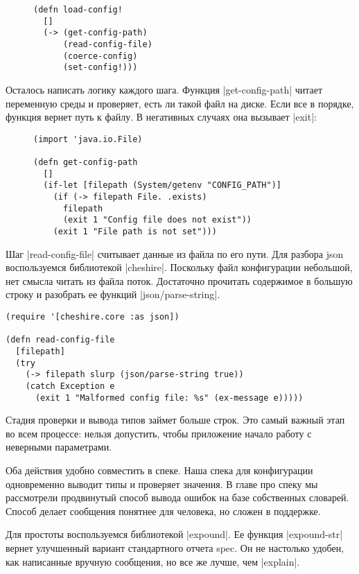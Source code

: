 \begin{figure}[!ht]
\begin{verbatim}
(defn load-config!
  []
  (-> (get-config-path)
      (read-config-file)
      (coerce-config)
      (set-config!)))
\end{verbatim}
\end{figure}

Осталось написать логику каждого шага. Функция \spverb|get-config-path| читает
переменную среды и проверяет, есть ли такой файл на диске. Если все в порядке,
функция вернет путь к файлу. В негативных случаях она вызывает \spverb|exit|:

\begin{figure}[!ht]
\begin{verbatim}
(import 'java.io.File)

(defn get-config-path
  []
  (if-let [filepath (System/getenv "CONFIG_PATH")]
    (if (-> filepath File. .exists)
      filepath
      (exit 1 "Config file does not exist"))
    (exit 1 "File path is not set")))
\end{verbatim}
\end{figure}

Шаг \spverb|read-config-file| считывает данные из файла по его пути. Для разбора json
воспользуемся библиотекой \spverb|cheshire|. Поскольку файл конфигурации небольшой, нет
смысла читать из файла поток. Достаточно прочитать содержимое в большую строку и
разобрать ее функций \spverb|json/parse-string|.

\begin{verbatim}
(require '[cheshire.core :as json])

(defn read-config-file
  [filepath]
  (try
    (-> filepath slurp (json/parse-string true))
    (catch Exception e
      (exit 1 "Malformed config file: %s" (ex-message e)))))
\end{verbatim}

Стадия проверки и вывода типов займет больше строк. Это самый важный этап во
всем процессе: нельзя допустить, чтобы приложение начало работу с неверными
параметрами.

Оба действия удобно совместить в спеке. Наша спека для конфигурации одновременно
выводит типы и проверяет значения. В главе про спеку мы рассмотрели продвинутый
способ вывода ошибок на базе собственных словарей. Способ делает сообщения
понятнее для человека, но сложен в поддержке.

Для простоты воспользуемся библиотекой \spverb|expound|. Ее функция \spverb|expound-str|
вернет улучшенный вариант стандартного отчета spec. Он не настолько удобен, как
написанные вручную сообщения, но все же лучше, чем \spverb|explain|.


